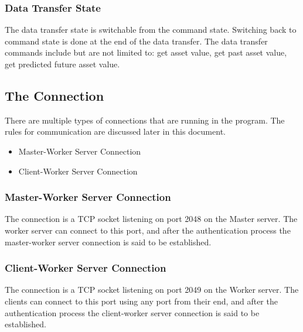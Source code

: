 \documentclass[a4paper]{article}
\begin{document}
\subsubsection{Data Transfer State}
\label{protocol_data_command}
The data transfer state is switchable from the command state. Switching back to
command state is done at the end of the data transfer. The data transfer
commands include but are not limited to: get asset value, get past asset value,
get predicted future asset value.

\subsection{The Connection}
\label{protocol_connection}
There are multiple types of connections that are running in the program. The
rules for communication are discussed later in this document.
\begin{itemize}
	\item Master-Worker Server Connection
	\item Client-Worker Server Connection
\end{itemize}

\subsubsection{Master-Worker Server Connection}
\label{protocol_masterserver_comms}
The connection is a TCP socket listening on port 2048 on the Master server. The
worker server can connect to this port, and after the authentication process
the master-worker server connection is said to be established.

\subsubsection{Client-Worker Server Connection}
\label{protocol_clientworker_comms}
The connection is a TCP socket listening on port 2049 on the Worker server. The
clients can connect to this port using any port from their end, and after the
authentication process the client-worker server connection is said to be 
established.
\end{document}
